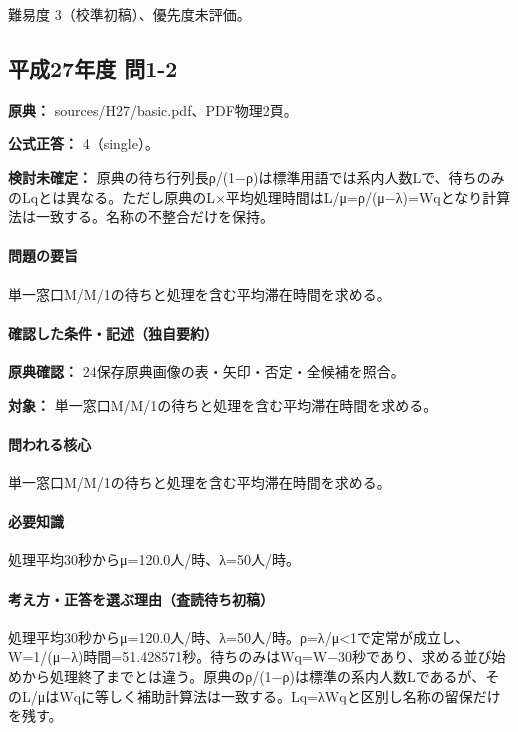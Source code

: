\par 難易度 3（校準初稿）、優先度未評価。

\subsection{平成27年度 問1-2}
\label{q:h27-reg-basic-1-2}

\noindent\textbf{原典：} sources/H27/basic.pdf、PDF物理2頁。

\textbf{公式正答：} 4（single）。

\par\textbf{検討未確定：} 原典の待ち行列長ρ/(1−ρ)は標準用語では系内人数Lで、待ちのみのLqとは異なる。ただし原典のL×平均処理時間はL/μ=ρ/(μ−λ)=\allowbreak{}Wqとなり計算法は一致する。名称の不整合だけを保持。

\paragraph{問題の要旨} 単一窓口M/M/1の待ちと処理を含む平均滞在時間を求める。

\paragraph{確認した条件・記述（独自要約）}\mbox{}\par

\noindent\textbf{原典確認：} 24保存原典画像の表・矢印・否定・全候補を照合。\par

\noindent\textbf{対象：} 単一窓口M/M/1の待ちと処理を含む平均滞在時間を求める。\par

\paragraph{問われる核心} 単一窓口M/M/1の待ちと処理を含む平均滞在時間を求める。

\paragraph{必要知識} 処理平均30秒からμ=120.0人/時、λ=50人/時。

\paragraph{考え方・正答を選ぶ理由（査読待ち初稿）} 処理平均30秒からμ=120.0人/時、λ=50人/時。ρ=λ/μ<1で定常が成立し、W=\allowbreak{}1/(μ−λ)時間=51.428571秒。待ちのみはWq=\allowbreak{}W−30秒であり、求める並び始めから処理終了までとは違う。原典のρ/(1−ρ)は標準の系内人数Lであるが、そのL/μはWqに等しく補助計算法は一致する。Lq=λWqと区別し名称の留保だけを残す。

